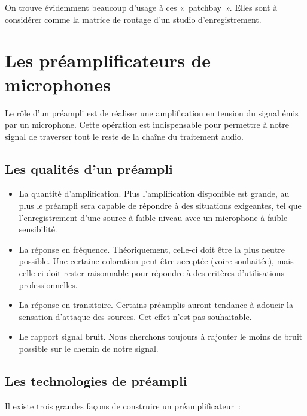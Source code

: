 \documentclass[
]{book}
\providecommand{\tightlist}{%
  \setlength{\itemsep}{0pt}\setlength{\parskip}{0pt}}
\begin{document}
On trouve évidemment beaucoup d'usage à ces «~patchbay~». Elles sont à considérer comme la matrice de routage d'un studio d'enregistrement.

\hypertarget{les-pruxe9amplificateurs-de-microphones}{%
\chapter{Les préamplificateurs de microphones}\label{les-pruxe9amplificateurs-de-microphones}}

Le rôle d'un préampli est de réaliser une amplification en tension du signal émis par un microphone. Cette opération est indispensable pour permettre à notre signal de traverser tout le reste de la chaîne du traitement audio.

\hypertarget{les-qualituxe9s-dun-pruxe9ampli}{%
\section{Les qualités d'un préampli}\label{les-qualituxe9s-dun-pruxe9ampli}}

\begin{itemize}
\tightlist
\item
  La quantité d'amplification. Plus l'amplification disponible est grande, au plus le préampli sera capable de répondre à des situations exigeantes, tel que l'enregistrement d'une source à faible niveau avec un microphone à faible sensibilité.
\item
  La réponse en fréquence. Théoriquement, celle-ci doit être la plus neutre possible. Une certaine coloration peut être acceptée (voire souhaitée), mais celle-ci doit rester raisonnable pour répondre à des critères d'utilisations professionnelles.
\item
  La réponse en transitoire. Certains préamplis auront tendance à adoucir la sensation d'attaque des sources. Cet effet n'est pas souhaitable.
\item
  Le rapport signal bruit. Nous cherchons toujours à rajouter le moins de bruit possible sur le chemin de notre signal.
\end{itemize}

\hypertarget{les-technologies-de-pruxe9ampli}{%
\section{Les technologies de préampli}\label{les-technologies-de-pruxe9ampli}}

Il existe trois grandes façons de construire un préamplificateur~:
\end{document}
